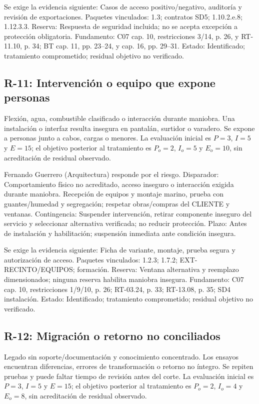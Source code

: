 Se exige la evidencia siguiente: Casos de acceso positivo/negativo, auditoría y revisión de exportaciones. Paquetes vinculados: 1.3; contratos SD5; 1.10.2.e.8; 1.12.3.3. Reserva: Respuesta de seguridad incluida; no se acepta excepción a protección obligatoria. Fundamento: C07 cap. 10, restricciones 3/14, p. 26, y RT-11.10, p. 34; BT cap. 11, pp. 23–24, y cap. 16, pp. 29–31. Estado: Identificado; tratamiento comprometido; residual objetivo no verificado. \parencites[cap.~10, restricciones 3/14, p.~26; RT-11.10, p.~34]{sd8-c07}[cap.~11, pp.~23--24; cap.~16, pp.~29--31]{sd8-bt}

\subsection{R-11: Intervención o equipo que expone personas}
Flexión, agua, combustible clasificado o interacción durante maniobra. Una instalación o interfaz resulta insegura en pantalán, surtidor o varadero. Se expone a personas junto a cabos, cargas o menores. La evaluación inicial es $P=3$, $I=5$ y $E=15$; el objetivo posterior al tratamiento es $P_o=2$, $I_o=5$ y $E_o=10$, sin acreditación de residual observado.

Fernando Guerrero (Arquitectura) responde por el riesgo. Disparador: Comportamiento físico no acreditado, acceso inseguro o interacción exigida durante maniobra. Recepción de equipos y montaje marino, prueba con guantes/humedad y segregación; respetar obras/compras del CLIENTE y ventanas. Contingencia: Suspender intervención, retirar componente inseguro del servicio y seleccionar alternativa verificada; no reducir protección. Plazo: Antes de instalación y habilitación; suspensión inmediata ante condición insegura.

Se exige la evidencia siguiente: Ficha de variante, montaje, prueba segura y autorización de acceso. Paquetes vinculados: 1.2.3; 1.7.2; EXT-RECINTO/EQUIPOS; formación. Reserva: Ventana alternativa y reemplazo dimensionados; ninguna reserva habilita maniobra insegura. Fundamento: C07 cap. 10, restricciones 1/9/10, p. 26; RT-03.24, p. 33; RT-13.08, p. 35; SD4 instalación. Estado: Identificado; tratamiento comprometido; residual objetivo no verificado. \parencite[cap.~10, restricciones 1/9/10, p.~26; RT-03.24, p.~33; RT-13.08, p.~35]{sd8-c07}

\subsection{R-12: Migración o retorno no conciliados}
Legado sin soporte/documentación y conocimiento concentrado. Los ensayos encuentran diferencias, errores de transformación o retorno no íntegro. Se repiten pruebas y puede faltar tiempo de revisión antes del corte. La evaluación inicial es $P=3$, $I=5$ y $E=15$; el objetivo posterior al tratamiento es $P_o=2$, $I_o=4$ y $E_o=8$, sin acreditación de residual observado.

